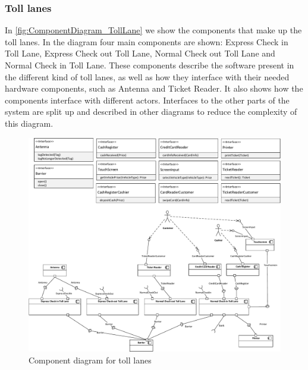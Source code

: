 \subsubsection*{Toll lanes}
In \autoref{fig:ComponentDiagram_TollLane} we show the components that make up the toll lanes. In the diagram four main components are shown: Express Check in Toll Lane, Express Check out Toll Lane, Normal Check out Toll Lane and Normal Check in Toll Lane. These components describe the software present in the different kind of toll lanes, as well as how they interface with their needed hardware components, such as Antenna and Ticket Reader. It also shows how the components interface with different actors. Interfaces to the other parts of the system are split up and described in other diagrams to reduce the complexity of this diagram.
\begin{figure}[H]
\centering
\includegraphics[width=1\textwidth]{img/component_diagrams/componentdiagram_tolllane}
\caption{Component diagram for toll lanes}
\label{fig:ComponentDiagram_TollLane}
\end{figure}